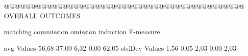 @@@@@@@@@@@@@@@@@@@@@@@@@@@@@@@@@@@@@@@@@@@@@ OVERALL OUTCOMES

                matching commission   omission  induction    F-measure   

avg Values      56,68      37,00       6,32      0,00        62,05      
stdDev Values   1,56       0,05       2,03      0,00         2,03




